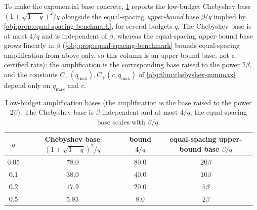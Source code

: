 To make the exponential base concrete, \cref{tab:rate-base} reports the low-budget Chebyshev base \((1+\sqrt{1-q})^2/q\) alongside the equal-spacing \emph{upper-bound} base \(\beta/q\) implied by \cref{obj:prop:equal-spacing-benchmark}, for several budgets \(q\). The Chebyshev base is at most \(4/q\) and is independent of \(\beta\), whereas the equal-spacing upper-bound base grows linearly in \(\beta\) (\cref{obj:prop:equal-spacing-benchmark} bounds equal-spacing amplification from above only, so this column is an upper-bound base, not a certified rate); the amplification is the corresponding base raised to the power \(2\beta\), and the constants \(C_-(q_{\max}),C_+(c,q_{\max})\) of \cref{obj:thm:chebyshev-minimax} depend only on \(q_{\max}\) and \(c\).

\begin{table}[h]
\centering
\begin{tabular}{cccc}
\hline
\(q\) & Chebyshev base \((1+\sqrt{1-q})^2/q\) & bound \(4/q\) & equal-spacing upper-bound base \(\beta/q\) \\
\hline
\(0.05\) & \(78.0\) & \(80.0\) & \(20\beta\) \\
\(0.1\) & \(38.0\) & \(40.0\) & \(10\beta\) \\
\(0.2\) & \(17.9\) & \(20.0\) & \(5\beta\) \\
\(0.5\) & \(5.83\) & \(8.0\) & \(2\beta\) \\
\hline
\end{tabular}
\caption{Low-budget amplification bases (the amplification is the base raised to the power \(2\beta\)). The Chebyshev base is \(\beta\)-independent and at most \(4/q\); the equal-spacing base scales with \(\beta/q\).}
\label{tab:rate-base}
\end{table}
